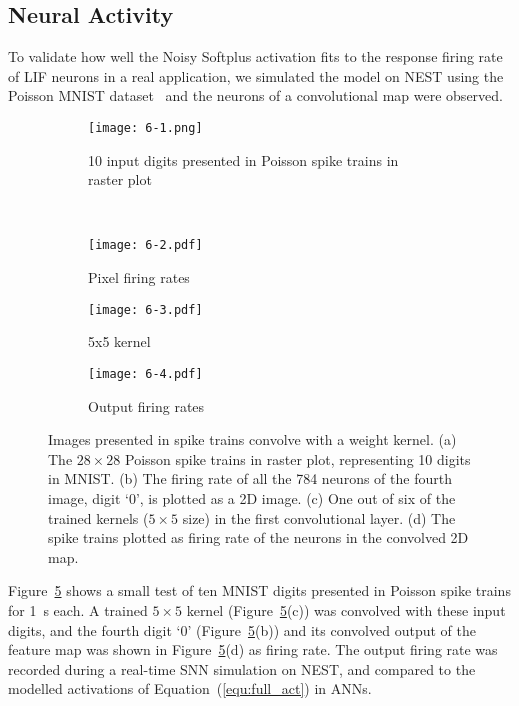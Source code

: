 \documentclass[runningheads,a4paper]{llncs}
\begin{document}
\subsection{Neural Activity}
To validate how well the Noisy Softplus activation fits to the response firing rate of LIF neurons in a real application, we simulated the model on NEST using the Poisson MNIST dataset~\cite{liu2016bench} and the neurons of a convolutional map were observed.

\begin{figure}[tbh!]
	\centering
	\begin{subfigure}[t]{0.8\textwidth}
		\texttt{[image: 6-1.png]}
		\caption{10 input digits presented in Poisson spike trains in raster plot}
		\label{Fig:61}
	\end{subfigure}\\
	\begin{subfigure}[t]{0.3\textwidth}
		\texttt{[image: 6-2.pdf]}
		\caption{Pixel firing rates}
		\label{Fig:62}
	\end{subfigure}
	\begin{subfigure}[t]{0.3\textwidth}
		\texttt{[image: 6-3.pdf]}
		\caption{5x5 kernel}
		\label{Fig:63}
	\end{subfigure}
	\begin{subfigure}[t]{0.3\textwidth}
		\texttt{[image: 6-4.pdf]}
		\caption{Output firing rates}
		\label{Fig:64}
	\end{subfigure}
	\caption{Images presented in spike trains convolve with a weight kernel. (a) The $28\times28$ Poisson spike trains in raster plot, representing 10 digits in MNIST. (b) The firing rate of all the 784 neurons of the fourth image, digit `0', is plotted as a 2D image.
		(c) One out of six of the trained kernels ($5\times5$ size) in the first convolutional layer.
		(d) The spike trains plotted as firing rate of the neurons in the convolved 2D map.}
	\label{fig:cnn}
\end{figure}

Figure~\ref{fig:cnn} shows a small test of ten MNIST digits presented in Poisson spike trains for 1~s each.
A trained $5\times5$ kernel (Figure~\ref{fig:cnn}(c)) was convolved with these input digits, and the fourth digit `0' (Figure~\ref{fig:cnn}(b)) and its convolved output of the feature map was shown in Figure~\ref{fig:cnn}(d) as firing rate.
The output firing rate was recorded during a real-time SNN simulation on NEST, and compared to the modelled activations of Equation~(\ref{equ:full_act}) in ANNs.
\end{document}
